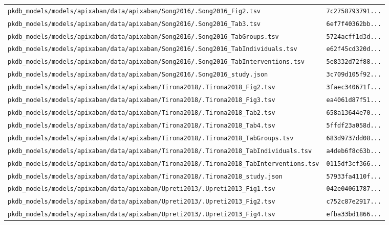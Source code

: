 \begin{longtable}{ll}
\texttt{pkdb\_models/models/apixaban/data/apixaban/Song2016/.Song2016\_Fig2.tsv} & \texttt{7c2758793791...} \\
\texttt{pkdb\_models/models/apixaban/data/apixaban/Song2016/.Song2016\_Tab3.tsv} & \texttt{6ef7f40362bb...} \\
\texttt{pkdb\_models/models/apixaban/data/apixaban/Song2016/.Song2016\_TabGroups.tsv} & \texttt{5724acff1d3d...} \\
\texttt{pkdb\_models/models/apixaban/data/apixaban/Song2016/.Song2016\_TabIndividuals.tsv} & \texttt{e62f45cd320d...} \\
\texttt{pkdb\_models/models/apixaban/data/apixaban/Song2016/.Song2016\_TabInterventions.tsv} & \texttt{5e8332d72f88...} \\
\texttt{pkdb\_models/models/apixaban/data/apixaban/Song2016/.Song2016\_study.json} & \texttt{3c709d105f92...} \\
\texttt{pkdb\_models/models/apixaban/data/apixaban/Tirona2018/.Tirona2018\_Fig2.tsv} & \texttt{3faec340671f...} \\
\texttt{pkdb\_models/models/apixaban/data/apixaban/Tirona2018/.Tirona2018\_Fig3.tsv} & \texttt{ea4061d87f51...} \\
\texttt{pkdb\_models/models/apixaban/data/apixaban/Tirona2018/.Tirona2018\_Tab2.tsv} & \texttt{658a13644e70...} \\
\texttt{pkdb\_models/models/apixaban/data/apixaban/Tirona2018/.Tirona2018\_Tab4.tsv} & \texttt{5ffdf23a058d...} \\
\texttt{pkdb\_models/models/apixaban/data/apixaban/Tirona2018/.Tirona2018\_TabGroups.tsv} & \texttt{683d9737dd08...} \\
\texttt{pkdb\_models/models/apixaban/data/apixaban/Tirona2018/.Tirona2018\_TabIndividuals.tsv} & \texttt{a4deb6f8c63b...} \\
\texttt{pkdb\_models/models/apixaban/data/apixaban/Tirona2018/.Tirona2018\_TabInterventions.tsv} & \texttt{0115df3cf366...} \\
\texttt{pkdb\_models/models/apixaban/data/apixaban/Tirona2018/.Tirona2018\_study.json} & \texttt{57933fa4110f...} \\
\texttt{pkdb\_models/models/apixaban/data/apixaban/Upreti2013/.Upreti2013\_Fig1.tsv} & \texttt{042e04061787...} \\
\texttt{pkdb\_models/models/apixaban/data/apixaban/Upreti2013/.Upreti2013\_Fig2.tsv} & \texttt{c752c87e2917...} \\
\texttt{pkdb\_models/models/apixaban/data/apixaban/Upreti2013/.Upreti2013\_Fig4.tsv} & \texttt{efba33bd1866...} \\

\end{longtable}
